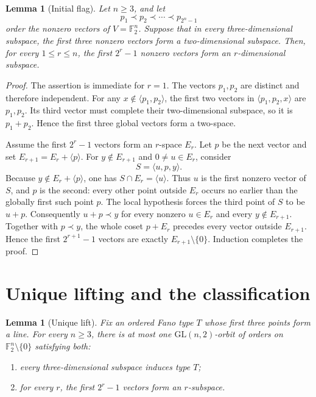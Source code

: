 \documentclass[11pt]{article}
\newtheorem{lemma}[theorem]{Lemma}
\begin{document}
\begin{lemma}[Initial flag]\label{lem:flag}
Let $n\ge3$, and let
\[
p_1\prec p_2\prec\cdots\prec p_{2^n-1}
\]
order the nonzero vectors of $V=\mathbb F_2^n$. Suppose that in every
three-dimensional subspace, the first three nonzero vectors form a
two-dimensional subspace. Then, for every $1\le r\le n$, the first $2^r-1$
nonzero vectors form an $r$-dimensional subspace.
\end{lemma}

\begin{proof}
The assertion is immediate for $r=1$. The vectors $p_1,p_2$ are distinct and
therefore independent. For any $x\notin\langle p_1,p_2\rangle$, the first two
vectors in $\langle p_1,p_2,x\rangle$ are $p_1,p_2$. Its third vector must
complete their two-dimensional subspace, so it is $p_1+p_2$. Hence the first
three global vectors form a two-space.

Assume the first $2^r-1$ vectors form an $r$-space $E_r$. Let $p$ be the next
vector and set $E_{r+1}=E_r+\langle p\rangle$. For $y\notin E_{r+1}$ and
$0\ne u\in E_r$, consider
\[
S=\langle u,p,y\rangle.
\]
Because $y\notin E_r+\langle p\rangle$, one has
$S\cap E_r=\langle u\rangle$. Thus $u$ is the first nonzero vector of $S$,
and $p$ is the second: every other point outside $E_r$ occurs no earlier than
the globally first such point $p$. The local hypothesis forces the third
point of $S$ to be $u+p$. Consequently $u+p\prec y$ for every nonzero
$u\in E_r$ and every $y\notin E_{r+1}$. Together with $p\prec y$, the whole
coset $p+E_r$ precedes every vector outside $E_{r+1}$. Hence the first
$2^{r+1}-1$ vectors are exactly $E_{r+1}\setminus\{0\}$. Induction completes
the proof.
\end{proof}

\section{Unique lifting and the classification}

\begin{lemma}[Unique lift]\label{lem:lift}
Fix an ordered Fano type $T$ whose first three points form a line. For every
$n\ge3$, there is at most one $\mathrm{GL}(n,2)$-orbit of orders on
$\mathbb F_2^n\setminus\{0\}$ satisfying both:
\begin{enumerate}
\item every three-dimensional subspace induces type $T$;
\item for every $r$, the first $2^r-1$ vectors form an $r$-subspace.
\end{enumerate}
\end{lemma}
\end{document}
